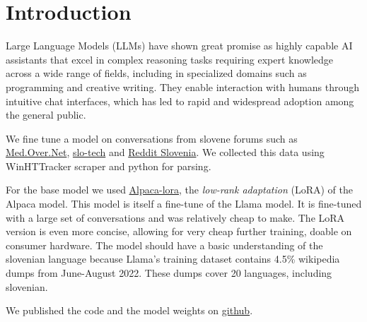 \documentclass[fleqn,moreauthors,10pt]{ds_report}
\affiliation{\textit{Advisors: Slavko Žitnik}}
\begin{document}
\flushbottom 

\maketitle 

\thispagestyle{empty} 


\section*{Introduction}
Large Language Models (LLMs) have shown great promise as highly capable AI assistants that excel in complex reasoning tasks requiring expert knowledge across a wide range of fields, including in specialized domains such as programming and creative writing. They enable interaction with humans through intuitive chat interfaces, which has led to rapid and widespread adoption among the general public.

We fine tune a model on conversations from slovene forums such as \href{https://forum.over.net/forum/}{Med.Over.Net}, \href{www.slo-tech.com}{slo-tech} and \href{https://www.reddit.com/r/Slovenia/}{Reddit Slovenia}. We collected this data using WinHTTracker scraper and python for parsing.

For the base model we used \href{https://github.com/tloen/alpaca-lora}{Alpaca-lora}, the \emph{low-rank adaptation} (LoRA)\cite{hu2021lowrank} of the Alpaca\cite{Bommasani2021FoundationModels} model. This model is itself a fine-tune of the Llama\cite{touvron2023llama} model. It is fine-tuned with a large set of conversations and was relatively cheap to make. The LoRA version is even more concise, allowing for very cheap further training, doable on consumer hardware.
The model should have a basic understanding of the slovenian language because Llama's training dataset contains 4.5\% wikipedia dumps from June-August 2022. These dumps cover 20 languages, including slovenian.

We published the code and the model weights on \href{https://github.com/UL-FRI-NLP-2023-2024/ul-fri-nlp-course-project-tree-pipit/}{github}.

\end{document}
